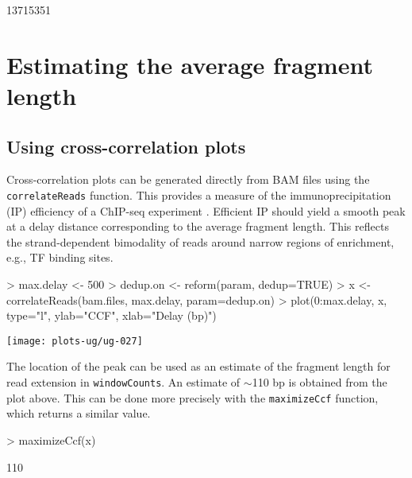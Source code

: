 \documentclass[12pt]{report}
\renewenvironment{Schunk}{\vspace{0pt}}{\vspace{0pt}}
\newcommand{\code}[1]{{\small\texttt{#1}}}
\begin{document}
\begin{Schunk}
\begin{Soutput}
[1] 13715351
\end{Soutput}
\end{Schunk}

\section{Estimating the average fragment length}
\label{sec:ccf}

\subsection{Using cross-correlation plots}
Cross-correlation plots can be generated directly from BAM files using the \code{correlateReads} function. 
This provides a measure of the immunoprecipitation (IP) efficiency of a ChIP-seq experiment \citep{kharchenko2008}. 
Efficient IP should yield a smooth peak at a delay distance corresponding to the average fragment length. 
This reflects the strand-dependent bimodality of reads around narrow regions of enrichment, e.g., TF binding sites. 

\begin{Schunk}
\begin{Sinput}
> max.delay <- 500
> dedup.on <- reform(param, dedup=TRUE)
> x <- correlateReads(bam.files, max.delay, param=dedup.on)
> plot(0:max.delay, x, type="l", ylab="CCF", xlab="Delay (bp)")
\end{Sinput}
\end{Schunk}

\begin{center}
\centering
\texttt{[image: plots-ug/ug-027]}
\end{center}

The location of the peak can be used as an estimate of the fragment length for read extension in \code{windowCounts}. 
An estimate of $\sim$110 bp is obtained from the plot above.
This can be done more precisely with the \code{maximizeCcf} function, which returns a similar value.

\begin{Schunk}
\begin{Sinput}
> maximizeCcf(x)
\end{Sinput}
\begin{Soutput}
[1] 110
\end{Soutput}
\end{Schunk}
\end{document}
